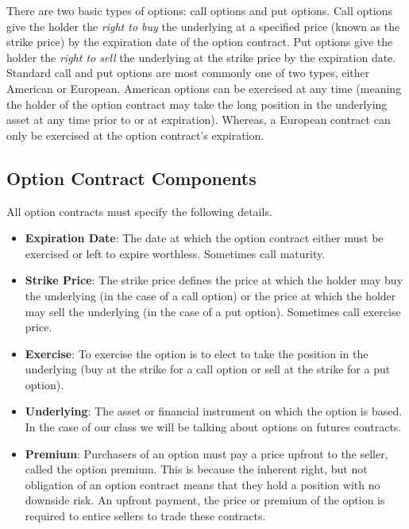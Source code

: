 \documentclass[
]{book}
\begin{document}
There are two basic types of options: call options and put options. Call options give the holder the \emph{right to buy} the underlying at a specified price (known as the strike price) by the expiration date of the option contract. Put options give the holder the \emph{right to sell} the underlying at the strike price by the expiration date. Standard call and put options are most commonly one of two types, either American or European. American options can be exercised at any time (meaning the holder of the option contract may take the long position in the underlying asset at any time prior to or at expiration). Whereas, a European contract can only be exercised at the option contract's expiration.

\hypertarget{option-contract-components}{%
\subsection{Option Contract Components}\label{option-contract-components}}

All option contracts must specify the following details.

\begin{itemize}
\item
  \textbf{Expiration Date}: The date at which the option contract either must be exercised or left to expire worthless. Sometimes call maturity.
\item
  \textbf{Strike Price}: The strike price defines the price at which the holder may buy the underlying (in the case of a call option) or the price at which the holder may sell the underlying (in the case of a put option). Sometimes call exercise price.
\item
  \textbf{Exercise}: To exercise the option is to elect to take the position in the underlying (buy at the strike for a call option or sell at the strike for a put option).
\item
  \textbf{Underlying}: The asset or financial instrument on which the option is based. In the case of our class we will be talking about options on futures contracts.
\item
  \textbf{Premium}: Purchasers of an option must pay a price upfront to the seller, called the option premium. This is because the inherent right, but not obligation of an option contract means that they hold a position with no downside risk. An upfront payment, the price or premium of the option is required to entice sellers to trade these contracts.
\end{itemize}
\end{document}
